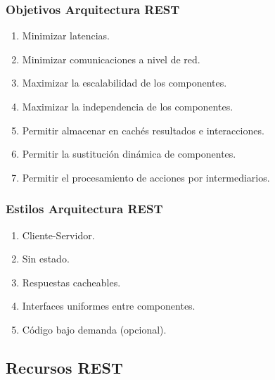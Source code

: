 \documentclass[a4paper,slidestop,xcolor=pst,blue]{beamer}
\begin{document}
\begin{frame}[c]
	\frametitle{Objetivos Arquitectura REST}
    \begin{enumerate}[<+->]
        \item Minimizar latencias.
        \item Minimizar comunicaciones a nivel de red.
        \item Maximizar la escalabilidad de los componentes.
        \item Maximizar la independencia de los componentes.
        \item Permitir almacenar en cachés resultados e interacciones.
        \item Permitir la sustitución dinámica de componentes.
        \item Permitir el procesamiento de acciones por intermediarios.
    \end{enumerate}
\end{frame}

\begin{frame}[c]
	\frametitle{Estilos Arquitectura REST}
    \begin{enumerate}[<+->]
        \item Cliente-Servidor.
        \item Sin estado.
        \item Respuestas cacheables.
        \item Interfaces uniformes entre componentes.
        \item Código bajo demanda (opcional).
    \end{enumerate}
\end{frame}

\subsection{Recursos REST}
\end{document}
